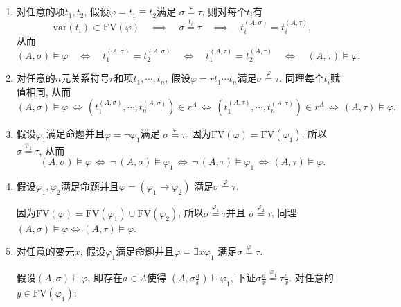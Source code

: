 \begin{enumerate}
    \item 对任意的项$t_1,t_2$, 假设$\varphi=t_1\equiv t_2$满足
    $\sigma\overset{\displaystyle\varphi}{=}\tau$, 则对每个$t_i$有
    \[
        \mathrm{var}(t_i)\subset\mathrm{FV}(\varphi)
        \quad\implies\quad\sigma\overset{\displaystyle t_i}{=}\tau
        \quad\implies\quad t_i^{(A,\sigma)}=t_i^{(A,\tau)},
    \]
    从而
    \[
        (A,\sigma)\models\varphi\quad\iff\quad
        t_1^{(A,\sigma)}=t_2^{(A,\sigma)}\quad\iff\quad
        t_1^{(A,\tau)}=t_2^{(A,\tau)}\quad\iff\quad(A,\tau)\models\varphi.
    \]

    \item 对任意的$n$元关系符号$r$和项$t_1,\cdots,t_n$,
    假设$\varphi=rt_1\cdots t_n$满足$\sigma\overset{\displaystyle\varphi}{=}\tau$.
    同理每个$t_i$赋值相同, 从而
    \[
        (A,\sigma)\models\varphi\,\iff\,
        (t_1^{(A,\sigma)},\cdots,t_n^{(A,\sigma)})\in r^A\,\iff\,
        (t_1^{(A,\tau)},\cdots,t_n^{(A,\tau)})\in r^A\,\iff\,
        (A,\tau)\models\varphi.
    \]

    \item 假设$\varphi_1$满足命题并且$\varphi=\neg\varphi_1$满足
    $\sigma\overset{\displaystyle\varphi}{=}\tau$.
    因为$\mathrm{FV}(\varphi)=\mathrm{FV}(\varphi_1)$, 所以
    $\sigma\overset{\displaystyle\varphi_1}{=}\tau$, 从而
    \[
        (A,\sigma)\models\varphi\,\iff\,\neg\,(A,\sigma)\models\varphi_1\,\iff\,
        \neg\,(A,\tau)\models\varphi_1\,\iff\,(A,\tau)\models\varphi.
    \]

    \item 假设$\varphi_1,\varphi_2$满足命题并且$\varphi=(\varphi_1\to\varphi_2)$
    满足$\sigma\overset{\displaystyle\varphi}{=}\tau$.
    
    \vspace{3pt}\hspace{2.17em}
    因为$\mathrm{FV}(\varphi)=\mathrm{FV}(\varphi_1)\cup\mathrm{FV}(\varphi_2)$,
    所以$\sigma\overset{\displaystyle\varphi_1}{=}\tau$并且
    $\sigma\overset{\displaystyle\varphi_2}{=}\tau$, 同理
    $(A,\sigma)\models\varphi\iff(A,\tau)\models\varphi$.

    \vspace{3pt}
    \item 对任意的变元$x$, 假设$\varphi_1$满足命题并且$\varphi=\exists x\varphi_1$
    满足$\sigma\overset{\displaystyle\varphi}{=}\tau$.

    \vspace{3pt}\hspace{2.17em}
    假设$(A,\sigma)\models\varphi$, 即存在$a\in A$使得
    $\displaystyle\left(A,\sigma\frac{a}{x}\right)\models\varphi_1$,
    下证$\displaystyle\sigma\frac{a}{x}\overset{\displaystyle\varphi_1}{=}
    \tau\frac{a}{x}$. 对任意的$y\in\mathrm{FV}(\varphi_1)$:


\end{enumerate}

